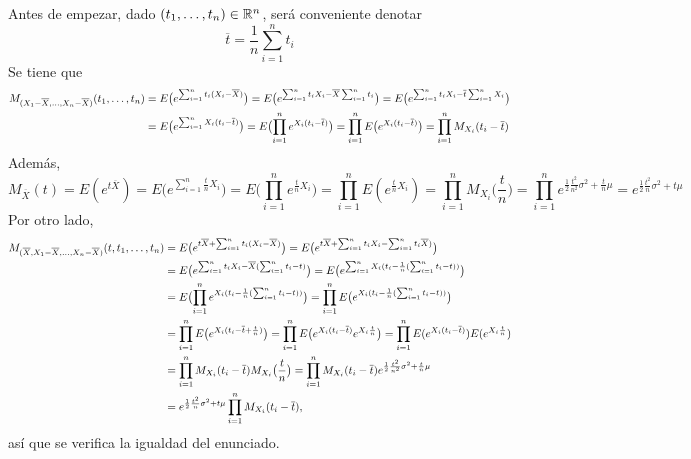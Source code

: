 \documentclass[11pt]{report}
\makeatletter
\renewenvironment{proof}[1][\proofname]{\par
  \pushQED{\qed}%
  \normalfont \topsep\z@skip %
  \trivlist
  \item[\hskip\labelsep
        \itshape
    #1\@addpunct{.}]\ignorespaces
}{%
  \popQED\endtrivlist\@endpefalse
}
\theoremstyle{definition}
\newcommand{\R}{\mathbb R}
\makeatother
\begin{document}
\begin{proof}
Antes de empezar, dado $(t_1,\mathellipsis,t_n) \in \R^n$, será conveniente denotar \[\overline{t} = \frac{1}{n}\sum_{i=1}^n t_i\]
Se tiene que
\[
\begin{aligned}[t]
M_{(X_1-\overline{X},\mathellipsis,X_n-\overline{X})}(t_1,\mathellipsis,t_n) &= E\bigl(e^{\sum_{i=1}^n t_i(X_i-\overline{X})}\bigr) = E\bigl(e^{\sum_{i=1}^n t_iX_i-\overline{X}\sum_{i=1}^n t_i}\bigr) = E\bigl(e^{\sum_{i=1}^n t_iX_i-\overline{t}\sum_{i=1}^n X_i}\bigr) \\ &= E\bigl(e^{\sum_{i=1}^n X_i(t_i-\overline{t})}\bigr) = E\bigl(\prod_{i=1}^n e^{X_i(t_i-\overline{t})}\bigr) = \prod_{i=1}^nE\bigl(e^{X_i(t_i-\overline{t})}\bigr) = \prod_{i=1}^n M_{X_i}(t_i-\overline{t})
\end{aligned}
\]
Además,
\[M_{\overline{X}}(t) = E(e^{t\overline{X}}) = E\bigl(e^{\sum_{i=1}^n \frac{t}{n}X_i}\bigr) = E\bigl(\prod_{i=1}^n e^{\frac{t}{n}X_i}\bigr) = \prod_{i=1}^n E(e^{\frac{t}{n}X_i}) = \prod_{i=1}^n M_{X_i}\bigl(\frac{t}{n}\bigr) = \prod_{i=1}^n e^{\frac{1}{2}\frac{t^2}{n^2}\sigma^2+\frac{t}{n}\mu} = e^{\frac{1}{2}\frac{t^2}{n}\sigma^2+t\mu}\]
Por otro lado,
\[\begin{aligned}[t]
    M_{(\overline{X},X_1-\overline{X},\mathellipsis,X_n-\overline{X})}(t,t_1,\mathellipsis,t_n) &= E\bigl(e^{t\overline{X}+\sum_{i=1}^n t_i(X_i-\overline{X})}\bigr) = E\bigl(e^{t\overline{X}+\sum_{i=1}^n t_iX_i-\sum_{i=1}^n t_i\overline{X})}\bigr) \\
    &= E\bigl(e^{\sum_{i=1}^n t_iX_i-\overline{X}(\sum_{i=1}^nt_i-t)}\bigr) = E\bigl(e^{\sum_{i=1}^n X_i(t_i-\frac{1}{n}(\sum_{i=1}^nt_i-t))}\bigr) \\ 
    &= E\bigl(\prod_{i=1}^n e^{X_i(t_i-\frac{1}{n}(\sum_{i=1}^nt_i-t))}\bigr) =\prod_{i=1}^n E\bigl(e^{X_i(t_i-\frac{1}{n}(\sum_{i=1}^nt_i-t))}\bigr) \\ 
    &= \prod_{i=1}^n E\bigl(e^{X_i(t_i-\overline{t}+\frac{t}{n})}\bigr) = \prod_{i=1}^n E\bigl(e^{X_i(t_i-\overline{t})}e^{X_i\frac{t}{n}}\bigr) = \prod_{i=1}^n E(e^{X_i(t_i-\overline{t})}) E(e^{X_i\frac{t}{n}}) \\
    &= \prod_{i=1}^n M_{X_i}(t_i-\overline{t}) M_{X_i}\bigl(\frac{t}{n}\bigr) = \prod_{i=1}^n M_{X_i}(t_i-\overline{t}) e^{\frac{1}{2}\frac{t^2}{n^2}\sigma^2+\frac{t}{n}\mu} \\
    &= e^{\frac{1}{2}\frac{t^2}{n}\sigma^2+t\mu}\prod_{i=1}^n M_{X_i}(t_i-\overline{t}),
\end{aligned}\]
así que se verifica la igualdad del enunciado.
\end{proof}
\end{document}
